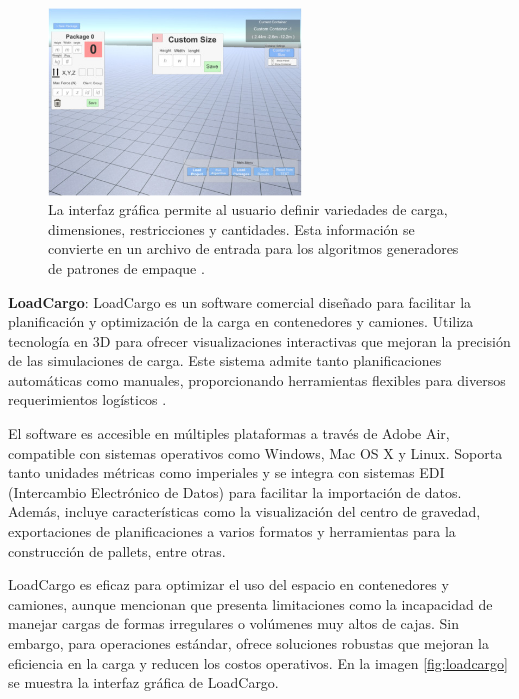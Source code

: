\begin{figure}[H]
    \centering
    \includegraphics[width=0.6\textwidth]{Figures/packagecargo.jpg}
    \caption{La interfaz gráfica permite al usuario definir variedades de carga, dimensiones, restricciones y cantidades. Esta información se convierte en un archivo de entrada para los algoritmos generadores de patrones de empaque \parencite{MARTINEZFRANCO2020100601}.}
    \label{fig:packagecargo}
\end{figure}


\textbf{LoadCargo}: LoadCargo es un software comercial diseñado para facilitar la planificación y optimización de la carga en contenedores y camiones. Utiliza tecnología en 3D para ofrecer visualizaciones interactivas que mejoran la precisión de las simulaciones de carga. Este sistema admite tanto planificaciones automáticas como manuales, proporcionando herramientas flexibles para diversos requerimientos logísticos \parencite{loadcargo2024}.

El software es accesible en múltiples plataformas a través de Adobe Air, compatible con sistemas operativos como Windows, Mac OS X y Linux. Soporta tanto unidades métricas como imperiales y se integra con sistemas EDI (Intercambio Electrónico de Datos) para facilitar la importación de datos. Además, incluye características como la visualización del centro de gravedad, exportaciones de planificaciones a varios formatos y herramientas para la construcción de pallets, entre otras.

LoadCargo es eficaz para optimizar el uso del espacio en contenedores y camiones, aunque mencionan que presenta limitaciones como la incapacidad de manejar cargas de formas irregulares o volúmenes muy altos de cajas. Sin embargo, para operaciones estándar, ofrece soluciones robustas que mejoran la eficiencia en la carga y reducen los costos operativos. En la imagen \ref{fig:loadcargo} se muestra la interfaz gráfica de LoadCargo.

